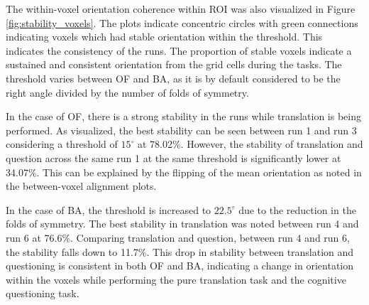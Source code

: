 \documentclass[a4paper]{article}
\begin{document}
The within-voxel orientation coherence within ROI was also visualized in Figure \ref{fig:stability_voxels}. The plots indicate concentric circles with green connections indicating voxels which had stable orientation within the threshold. This indicates the consistency of the runs. The proportion of stable voxels indicate a sustained and consistent orientation from the grid cells during the tasks. The threshold varies between OF and BA, as it is by default considered to be the right angle divided by the number of folds of symmetry.

In the case of OF, there is a strong stability in the runs while translation is being performed. As visualized, the best stability can be seen between run 1 and run 3 considering a threshold of $15^\circ$ at 78.02\%. However, the stability of translation and question across the same run 1 at the same threshold is significantly lower at 34.07\%. This can be explained by the flipping of the mean orientation as noted in the between-voxel alignment plots.

In the case of BA, the threshold is increased to $22.5^\circ$ due to the reduction in the folds of symmetry. The best stability in translation was noted between run 4 and run 6 at 76.6\%. Comparing translation and question, between run 4 and run 6, the stability falls down to 11.7\%. This drop in stability between translation and questioning is consistent in both OF and BA, indicating a change in orientation within the voxels while performing the pure translation task and the cognitive questioning task.\\
\end{document}
